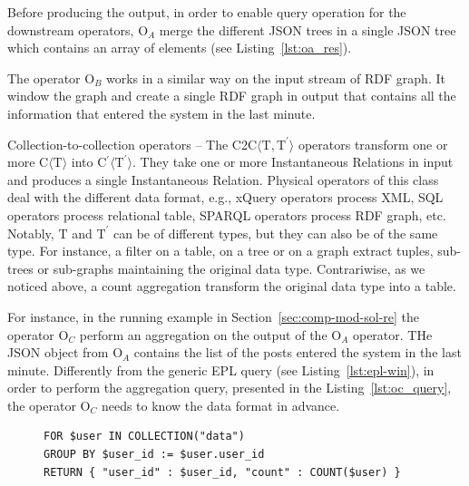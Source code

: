 {\medskip

Before producing the output, in order to enable query operation for the downstream operators, O$_A$ merge the different JSON trees in a single JSON tree which contains an array of elements (see Listing~\ref{lst:oa_res}).

The operator O$_B$ works in a similar way on the input stream of RDF graph. It window the graph and create a single RDF graph in output that contains all the information that entered the system in the last minute.

\medskip

\textsf{Collection-to-collection operators} -- The C2C$\langle\mathrm{T},\mathrm{T^{\prime}}\rangle$ operators transform one or more C$\langle\mathrm{T}\rangle$ into C$^{\prime}\langle\mathrm{T^{\prime}}\rangle$. They take one or more Instantaneous Relations in input and produces a single Instantaneous Relation.
Physical operators of this class deal with the different data format, e.g., xQuery operators process  XML,  SQL operators process relational table, SPARQL operators process RDF graph, etc. Notably, $\mathrm{T}$ and $\mathrm{T^{\prime}}$ can be of different types, but they can also be of the same type. For instance, a filter on a table, on a tree or on a graph extract tuples, sub-trees or sub-graphs maintaining the original data type. Contrariwise, as we noticed above, a count aggregation transform the original data type into a table.

For instance, in the running example in Section~\ref{sec:comp-mod-sol-re} the operator O$_C$ perform an aggregation on the output of the O$_A$ operator. THe JSON object from O$_A$ contains the list of the posts entered the system in the last minute.
Differently from the generic EPL query (see Listing~\ref{lst:epl-win}), in order to perform the aggregation query, presented in the Listing~\ref{lst:oc_query}, the operator O$_C$ needs to know the data format in advance.

\begin{figure}[ht]
\begin{minipage}{0.95\linewidth}
\begin{lstlisting}[caption={JSONiq Query for aggregating JSON element, applied by the operators O$_C$.},label=lst:oc_query,style=JSONIQ]
FOR $user IN COLLECTION("data")
GROUP BY $user_id := $user.user_id
RETURN { "user_id" : $user_id, "count" : COUNT($user) }
\end{lstlisting}
\end{minipage}
\end{figure}

}
